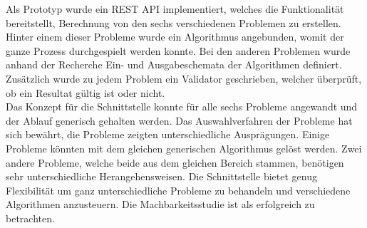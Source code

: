 Als Prototyp wurde ein REST API implementiert, welches die Funktionalität bereitstellt, Berechnung von den sechs verschiedenen Problemen zu erstellen. Hinter einem dieser Probleme wurde ein 
Algorithmus angebunden, womit der ganze Prozess durchgespielt werden konnte. Bei den anderen Problemen wurde anhand der Recherche Ein- und Ausgabeschemata der Algorithmen definiert. 
Zusätzlich wurde zu jedem Problem ein Validator geschrieben, welcher überprüft, ob ein Resultat gültig ist oder nicht.\\

Das Konzept für die Schnittstelle konnte für alle sechs Probleme angewandt und der Ablauf generisch gehalten werden. Das Auswahlverfahren der Probleme hat sich bewährt, die Probleme 
zeigten unterschiedliche Ausprägungen. Einige Probleme könnten mit dem gleichen generischen Algorithmus gelöst werden. Zwei andere Probleme, welche beide aus dem gleichen Bereich stammen, 
benötigen sehr unterschiedliche Herangehensweisen. Die Schnittstelle bietet genug Flexibilität um ganz unterschiedliche Probleme zu behandeln und verschiedene Algorithmen anzusteuern. Die 
Machbarkeitsstudie ist als erfolgreich zu betrachten.
